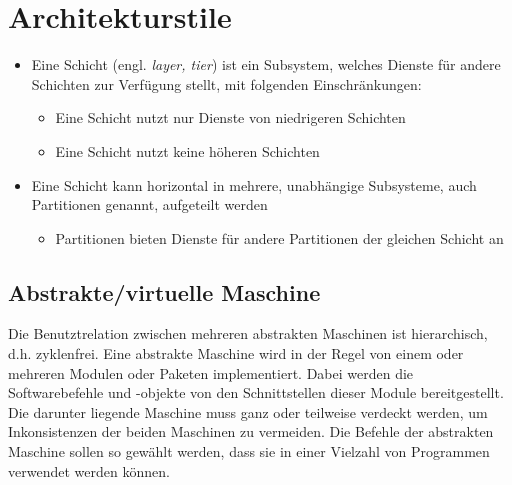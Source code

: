 \section{Architekturstile}


\begin{itemize}
    \item Eine Schicht (engl. \textit{layer, tier}) ist ein Subsystem, welches Dienste für andere Schichten zur Verfügung stellt, mit folgenden Einschränkungen:
    \begin{itemize}
        \item Eine Schicht nutzt nur Dienste von niedrigeren Schichten
        \item Eine Schicht nutzt keine höheren Schichten
    \end{itemize}
    \item Eine Schicht kann horizontal in mehrere, unabhängige Subsysteme, auch Partitionen genannt, aufgeteilt werden
    \begin{itemize}
        \item Partitionen bieten Dienste für andere Partitionen der gleichen Schicht an
    \end{itemize}
\end{itemize}


\subsection{Abstrakte/virtuelle Maschine}
Die Benutztrelation zwischen mehreren abstrakten Maschinen ist hierarchisch, d.h. zyklenfrei.
Eine abstrakte Maschine wird in der Regel von einem oder mehreren Modulen oder Paketen implementiert. Dabei werden die Softwarebefehle und -objekte von den Schnittstellen dieser Module bereitgestellt.
Die darunter liegende Maschine muss ganz oder teilweise verdeckt werden, um Inkonsistenzen der beiden Maschinen zu vermeiden.
Die Befehle der abstrakten Maschine sollen so gewählt werden, dass sie in einer Vielzahl von Programmen verwendet werden können.